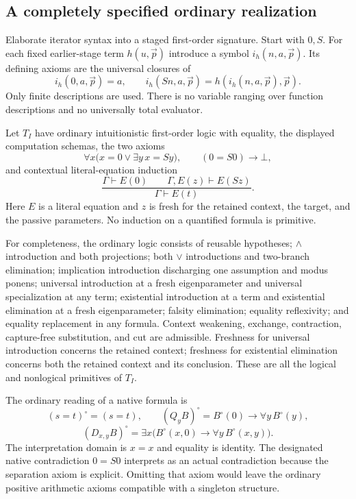 \documentclass[11pt]{article}
\theoremstyle{definition}\newtheorem{definition}[theorem]{Definition}
\begin{document}
\subsection{A completely specified ordinary realization}
Elaborate iterator syntax into a staged first-order signature.  Start with
$0,S$.  For each fixed earlier-stage term $h(u,\vec p)$ introduce a symbol
$i_h(n,a,\vec p)$.  Its defining axioms are the universal closures of
\[
 i_h(0,a,\vec p)=a,\qquad
 i_h(Sn,a,\vec p)=h(i_h(n,a,\vec p),\vec p).
\]
Only finite descriptions are used.  There is no variable ranging over
function descriptions and no universally total evaluator.

Let $T_I$ have ordinary intuitionistic first-order logic with equality,
the displayed computation schemas, the two axioms
\[
 \forall x\bigl(x=0\lor\exists y\,x=Sy\bigr),\qquad
 (0=S0)\to\bot,
\]
and contextual literal-equation induction
\[
 \frac{\Gamma\vdash E(0)\qquad\Gamma,E(z)\vdash E(Sz)}
      {\Gamma\vdash E(t)}.
\]
Here $E$ is a literal equation and $z$ is fresh for the retained context,
the target, and the passive parameters.  No induction on a quantified
formula is primitive.

For completeness, the ordinary logic consists of reusable hypotheses;
$\land$ introduction and both projections; both $\lor$ introductions and
two-branch elimination; implication introduction discharging one
assumption and modus ponens; universal introduction at a fresh
eigenparameter and universal specialization at any term; existential
introduction at a term and existential elimination at a fresh
eigenparameter; falsity elimination; equality reflexivity; and equality
replacement in any formula.  Context weakening, exchange, contraction,
capture-free substitution, and cut are admissible.  Freshness for
universal introduction concerns the retained context; freshness for
existential elimination concerns both the retained context and its
conclusion.  These are all the logical and nonlogical primitives of
$T_I$.

The ordinary reading of a native formula is
\[
 (s=t)^\circ=(s=t),\qquad
 (Q_yB)^\circ=B^\circ(0)\to\forall y\,B^\circ(y),
\]
\[
 (D_{x,y}B)^\circ=
 \exists x\bigl(B^\circ(x,0)\to\forall y\,B^\circ(x,y)\bigr).
\]
The interpretation domain is $x=x$ and equality is identity.  The
designated native contradiction $0=S0$ interprets as an actual
contradiction because the separation axiom is explicit.  Omitting that
axiom would leave the ordinary positive arithmetic axioms compatible
with a singleton structure.
\end{document}
